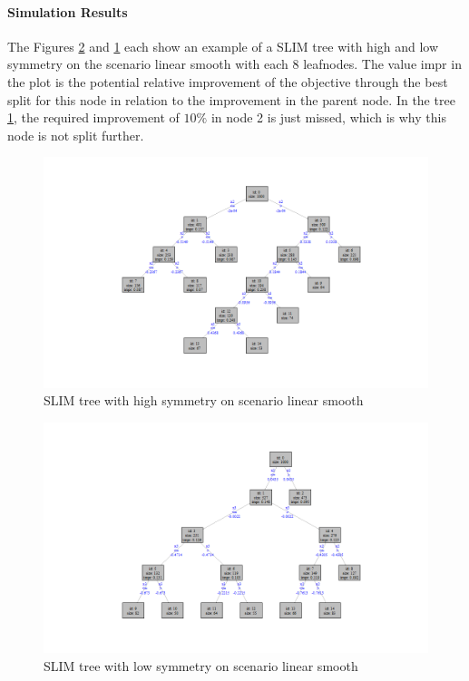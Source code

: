 \paragraph{Simulation Results}
The Figures \ref{fig:app_tree_low_symmetry} and \ref{fig:app_tree_high_symmetry} each show an example of a SLIM tree with high and low symmetry on the scenario linear smooth with each 8 leafnodes. The value impr in the plot is the potential relative improvement of the objective through the best split for this node in relation to the improvement in the parent node. In the tree \ref{fig:app_tree_high_symmetry}, the required improvement of $10 \%$ in node 2 is just missed, which is why this node is not split further.
\begin{figure}[!htb]
    \centering    
    \includegraphics[width = 16cm]{Figures/simulations/batchtools/basic_scenarios/linear_smooth/tree_high_symmetry.png}  
    \caption{SLIM tree with high symmetry on scenario linear smooth}
    \label{fig:app_tree_high_symmetry}
\end{figure}

\begin{figure}[!htb]
    \includegraphics[width = 16cm]{Figures/simulations/batchtools/basic_scenarios/linear_smooth/tree_low_symmetry.png}
    \caption{SLIM tree with low symmetry on scenario linear smooth}
    \label{fig:app_tree_low_symmetry}
\end{figure}





